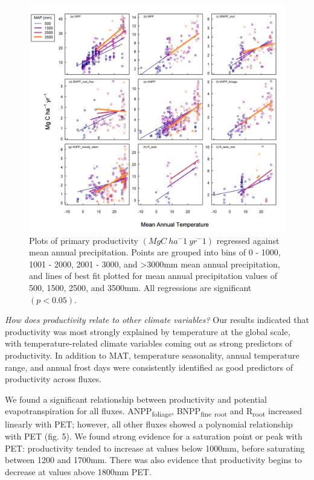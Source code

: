 \documentclass[]{article}
\begin{document}
\begin{figure}[H]
\includegraphics[width=1\linewidth]{mat_map_interaction} \caption{Plots of primary productivity $(MgC~ha^-1~yr^-1)$ regressed against mean annual precipitation. Points are grouped into bins of 0 - 1000, 1001 - 2000, 2001 - 3000, and >3000mm mean annual precipitation, and lines of best fit plotted for mean annual precipitation values of 500, 1500, 2500, and 3500mm. All regressions are significant $(p<0.05)$.}\label{fig:unnamed-chunk-8}
\end{figure}

\emph{How does productivity relate to other climate variables?} Our
results indicated that productivity was most strongly explained by
temperature at the global scale, with temperature-related climate
variables coming out as strong predictors of productivity. In addition
to MAT, temperature seasonality, annual temperature range, and annual
frost days were consistently identified as good predictors of
productivity across fluxes.

We found a significant relationship between productivity and potential
evapotranspiration for all fluxes. ANPP\textsubscript{foliage},
BNPP\textsubscript{fine} \textsubscript{root} and R\textsubscript{root}
increased linearly with PET; however, all other fluxes showed a
polynomial relationship with PET (fig. 5). We found strong evidence for
a saturation point or peak with PET: productivity tended to increase at
values below 1000mm, before saturating between 1200 and 1700mm. There
was also evidence that productivity begins to decrease at values above
1800mm PET.
\end{document}
